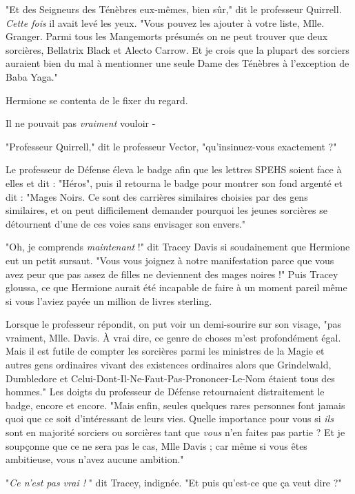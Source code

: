 "Et des Seigneurs des Ténèbres eux-mêmes, bien sûr," dit le professeur Quirrell. \emph{Cette fois}  il avait levé les yeux. "Vous pouvez les ajouter à votre liste, Mlle. Granger. Parmi tous les Mangemorts présumés on ne peut trouver que deux sorcières, Bellatrix Black et Alecto Carrow. Et je crois que la plupart des sorciers auraient bien du mal à mentionner une seule Dame des Ténèbres à l'exception de Baba Yaga."

Hermione se contenta de le fixer du regard.

Il ne pouvait pas \emph{vraiment}  vouloir -

"Professeur Quirrell," dit le professeur Vector, "qu'insinuez-vous exactement ?"

Le professeur de Défense éleva le badge afin que les lettres SPEHS soient face à elles et dit : "Héros", puis il retourna le badge pour montrer son fond argenté et dit : "Mages Noirs. Ce sont des carrières similaires choisies par des gens similaires, et on peut difficilement demander pourquoi les jeunes sorcières se détournent d'une de ces voies sans envisager son envers."

"Oh, je comprends \emph{maintenant}  !" dit Tracey Davis si soudainement que Hermione eut un petit sursaut. "Vous vous joignez à notre manifestation parce que vous avez peur que pas assez de filles ne deviennent des mages noires !" Puis Tracey gloussa, ce que Hermione aurait été incapable de faire à un moment pareil même si vous l'aviez payée un million de livres sterling.

Lorsque le professeur répondit, on put voir un demi-sourire sur son visage, "pas vraiment, Mlle. Davis. À vrai dire, ce genre de choses m'est profondément égal. Mais il est futile de compter les sorcières parmi les ministres de la Magie et autres gens ordinaires vivant des existences ordinaires alors que Grindelwald, Dumbledore et Celui-Dont-Il-Ne-Faut-Pas-Prononcer-Le-Nom étaient tous des hommes." Les doigts du professeur de Défense retournaient distraitement le badge, encore et encore. "Mais enfin, seules quelques rares personnes font jamais quoi que ce soit d'intéressant de leurs vies. Quelle importance pour vous si \emph{ils}  sont en majorité sorciers ou sorcières tant que \emph{vous}  n'en faites pas partie ? Et je soupçonne que ce ne sera pas le cas, Mlle Davis ; car même si vous êtes ambitieuse, vous n'avez aucune ambition."

"\emph{Ce n'est pas vrai ! } " dit Tracey, indignée. "Et puis qu'est-ce que ça veut dire ?"

